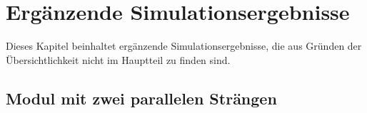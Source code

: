\chapter{Erg\"anzende Simulationsergebnisse}
\label{app:simu:complementary}


Dieses   Kapitel  beinhaltet   erg\"anzende  Simulationsergebnisse,   die  aus
Gr\"unden der \"Ubersichtlichkeit nicht im Hauptteil zu finden sind.


\section{Modul mit zwei parallelen Str\"angen}
\label{app:sec:simu:complementary:36x2}

